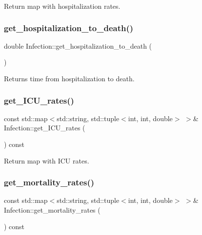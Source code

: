 Return map with hospitalization rates. 

\mbox{\label{classInfection_ab0b519435d45c41e37b39dd45f87078d}} 
\subsubsection{\texorpdfstring{get\+\_\+hospitalization\+\_\+to\+\_\+death()}{get\_hospitalization\_to\_death()}}
{\footnotesize\ttfamily double Infection\+::get\+\_\+hospitalization\+\_\+to\+\_\+death (\begin{DoxyParamCaption}{ }\end{DoxyParamCaption})}



Returns time from hospitalization to death. 

\mbox{\label{classInfection_adcee70238be54e9dad57cfebb2c32034}} 
\subsubsection{\texorpdfstring{get\+\_\+\+I\+C\+U\+\_\+rates()}{get\_ICU\_rates()}}
{\footnotesize\ttfamily const std\+::map$<$std\+::string, std\+::tuple$<$int, int, double$>$ $>$\& Infection\+::get\+\_\+\+I\+C\+U\+\_\+rates (\begin{DoxyParamCaption}{ }\end{DoxyParamCaption}) const\hspace{0.3cm}{\ttfamily [inline]}}



Return map with I\+CU rates. 

\mbox{\label{classInfection_a8244b3faf60b743632dddd50f866dae9}} 
\subsubsection{\texorpdfstring{get\+\_\+mortality\+\_\+rates()}{get\_mortality\_rates()}}
{\footnotesize\ttfamily const std\+::map$<$std\+::string, std\+::tuple$<$int, int, double$>$ $>$\& Infection\+::get\+\_\+mortality\+\_\+rates (\begin{DoxyParamCaption}{ }\end{DoxyParamCaption}) const\hspace{0.3cm}{\ttfamily [inline]}}




